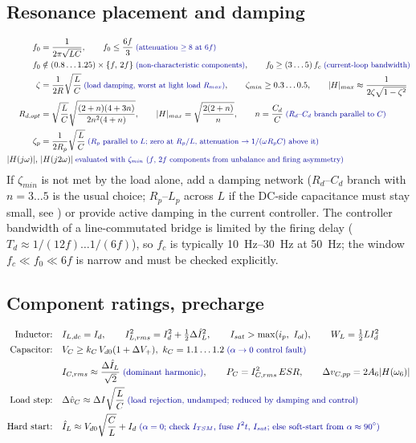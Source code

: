 \documentclass[10pt,a4paper]{scrartcl}
\newcommand{\Vdo}{V_{d0}}
\newcommand{\Id}{I_{d}}
\newcommand{\ITSM}{I_{TSM}}
\newcommand{\iit}{I^{2}t}
\newcommand{\rt}[1]{\text{\small\color{blue!60!black} #1}}
\begin{document}
\subsection{Resonance placement and damping}
\begin{align}
f_0 &= \frac{1}{2\pi\sqrt{LC}}, \qquad
f_0 \le \frac{6f}{3} \;\rt{(attenuation $\ge 8$ at $6f$)} \label{eq:f0}\\
f_0 &\notin (0.8\ldots1.25)\times\{f,\,2f\} \;\rt{(non-characteristic components)}, \qquad
f_0 \ge (3\ldots5)\,f_{c} \;\rt{(current-loop bandwidth)} \\
\zeta &= \frac{1}{2R}\sqrt{\frac{L}{C}} \;\rt{(load damping, worst at light load $R_{max}$)}, \qquad
\zeta_{min} \ge 0.3\ldots0.5, \qquad
|H|_{max} \approx \frac{1}{2\zeta\sqrt{1-\zeta^2}} \label{eq:zeta}\\
R_{d,opt} &= \sqrt{\frac{L}{C}}\sqrt{\frac{(2+n)(4+3n)}{2n^2(4+n)}}, \qquad
|H|_{max} = \sqrt{\frac{2(2+n)}{n}}, \qquad n = \frac{C_d}{C} \;\rt{($R_d$--$C_d$ branch parallel to $C$)} \label{eq:Rd}\\
\zeta_{p} &= \frac{1}{2R_{p}}\sqrt{\frac{L}{C}} \;\rt{($R_p$ parallel to $L$; zero at $R_p/L$, attenuation $\to 1/(\omega R_p C)$ above it)} \\
|H(j\omega)|,\ &|H(j2\omega)| \;\rt{evaluated with $\zeta_{min}$ ($f$, $2f$ components from unbalance and firing asymmetry)}
\end{align}
If $\zeta_{min}$ is not met by the load alone, add a damping network ($R_d$--$C_d$ branch with $n = 3\ldots5$ is the usual choice; $R_p$--$L_p$ across $L$ if the DC-side capacitance must stay small, see \cite{erickson}) or provide active damping in the current controller. The controller bandwidth of a line-commutated bridge is limited by the firing delay ($T_d\approx 1/(12f)\ldots1/(6f)$), so $f_c$ is typically \SIrange{10}{30}{Hz} at \SI{50}{Hz}; the window $f_c \ll f_0 \ll 6f$ is narrow and must be checked explicitly.

\subsection{Component ratings, precharge}
\begin{align}
\text{Inductor:}\quad & I_{L,dc} = \Id, \qquad I_{L,rms}^2 = \Id^2 + \tfrac12\Delta\hat I_L^2, \qquad
I_{sat} > \max(i_p,\ I_{ol}), \qquad W_L = \tfrac12 L\Id^2 \label{eq:Lrat}\\
\text{Capacitor:}\quad & V_{C} \ge k_C\,\Vdo(1+\Delta V_+),\ k_C=1.1\ldots1.2 \;\rt{($\alpha\to0$ control fault)} \label{eq:Crat}\\
& I_{C,rms} \approx \frac{\Delta\hat I_L}{\sqrt2} \;\rt{(dominant harmonic)}, \qquad P_C = I_{C,rms}^2\,ESR, \qquad \Delta v_{C,pp} = 2A_6|H(\omega_6)| \\
\text{Load step:}\quad & \Delta\hat v_C \approx \Delta I\sqrt{\frac{L}{C}} \;\rt{(load rejection, undamped; reduced by damping and control)} \label{eq:step}\\
\text{Hard start:}\quad & \hat I_{L} \approx \Vdo\sqrt{\frac{C}{L}} + \Id \;\rt{($\alpha=0$; check $\ITSM$, fuse $\iit$, $I_{sat}$; else soft-start from $\alpha\approx\SI{90}{\degree}$)} \label{eq:inrush}
\end{align}
\end{document}
